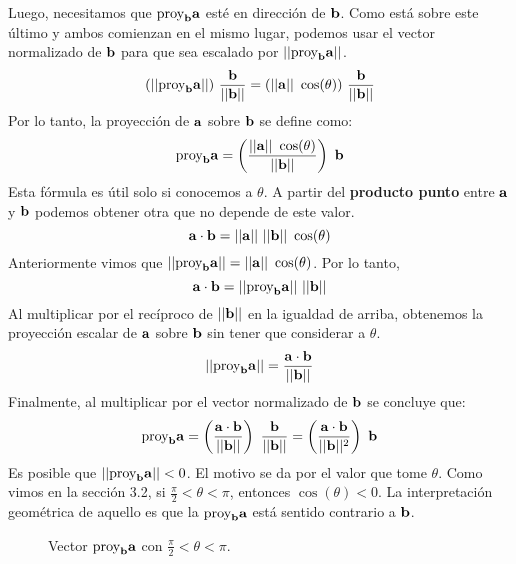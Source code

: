 \documentclass[12pt]{article}
\begin{document}
Luego, necesitamos que $\proy{a}{b}$ esté en dirección de $\vecmat{b}$. Como está sobre este último y ambos comienzan en el mismo lugar, podemos usar el vector normalizado de $\vecmat{b}$ para que sea escalado por $||\proy{a}{b}||$.
\[
  (||\proy{a}{b}||) \ \frac{\vecmat{b}}{||\vecmat{b}||} = (||\vecmat{a}|| \ \cos(\theta)) \ \frac{\vecmat{b}}{||\vecmat{b}||}
\]
Por lo tanto, la proyección de $\vecmat{a}$ sobre $\vecmat{b}$ se define como:
\[
  \proy{a}{b} = \left(\frac{||\vecmat{a}|| \ \cos(\theta)}{||\vecmat{b}||}\right) \ \vecmat{b}  
\]
Esta fórmula es útil solo si conocemos a $\theta$. A partir del \textbf{producto punto} entre $\vecmat{a}$ y $\vecmat{b}$ podemos obtener otra que no depende de este valor.
\[
  \vecmat{a} \cdot \vecmat{b} = ||\vecmat{a}|| \ ||\vecmat{b}|| \ \cos(\theta)
\]
Anteriormente vimos que $||\proy{a}{b}|| = ||\vecmat{a}|| \ \cos(\theta)$. Por lo tanto,
\[
  \vecmat{a} \cdot \vecmat{b} = ||\proy{a}{b}|| \ ||\vecmat{b}||
\]
Al multiplicar por el recíproco de $||\vecmat{b}||$ en la igualdad de arriba, obtenemos la proyección escalar de $\vecmat{a}$ sobre $\vecmat{b}$ sin tener que considerar a $\theta$.
\[
  ||\proy{a}{b}|| = \frac{\vecmat{a} \cdot \vecmat{b}}{||\vecmat{b}||}
\]
Finalmente, al multiplicar por el vector normalizado de $\vecmat{b}$ se concluye que:
\[
  \proy{a}{b} = \left(\frac{\vecmat{a} \cdot \vecmat{b}}{||\vecmat{b}||}\right) \ \frac{\vecmat{b}}{||\vecmat{b}||}
              = \left(\frac{\vecmat{a} \cdot \vecmat{b}}{||\vecmat{b}||^{2}}\right) \ \vecmat{b}
\]
Es posible que $||\proy{a}{b}|| < 0$. El motivo se da por el valor que tome $\theta$. Como vimos en la sección 3.2, si $\frac{\pi}{2} < \theta < \pi$, entonces $\cos(\theta) < 0$. La interpretación geométrica de aquello es que la $\proy{a}{b}$ está sentido contrario a $\vecmat{b}$.

\begin{figure}[hbt!]
\centering


\caption{Vector $\proy{a}{b}$ con $\frac{\pi}{2} < \theta < \pi$.}

\end{figure}
\end{document}
